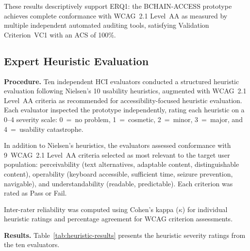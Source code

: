 \documentclass[journal,onecolumn]{IEEEtran}
\begin{document}
These results descriptively support ERQ1: the BCHAIN-ACCESS prototype
achieves complete conformance with WCAG~2.1 Level~AA as measured by
multiple independent automated auditing tools, satisfying Validation
Criterion~VC1 with an ACS of 100\%.

\subsection{Expert Heuristic Evaluation}
\label{subsec:heuristic-evaluation}

\noindent\textbf{Procedure.} 
Ten independent HCI evaluators conducted a structured
heuristic evaluation following Nielsen's 10 usability
heuristics\cite{nielsen1994usability}, augmented with WCAG~2.1
Level~AA criteria as recommended for accessibility-focused
heuristic evaluation\cite{paz2019heuristic}. Each evaluator
inspected the prototype independently, rating each heuristic on a
0--4 severity scale: 0~=~no problem, 1~=~cosmetic,
2~=~minor, 3~=~major, and 4~=~usability catastrophe.

In addition to Nielsen's heuristics, the evaluators assessed conformance
with 9~WCAG~2.1 Level~AA criteria selected as most relevant to the
target user population: perceivability (text alternatives, adaptable
content, distinguishable content), operability (keyboard accessible,
sufficient time, seizure prevention, navigable), and understandability
(readable, predictable). Each criterion was rated as Pass or Fail.

Inter-rater reliability was computed using Cohen's kappa ($\kappa$) for
individual heuristic ratings and percentage agreement for WCAG
criterion assessments.

\noindent\textbf{Results.} 
Table~\ref{tab:heuristic-results} presents the heuristic severity
ratings from the ten evaluators.
\end{document}
